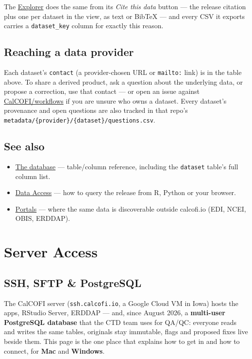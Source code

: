 \documentclass[
  letterpaper,
  DIV=11,
  numbers=noendperiod]{scrreprt}
\providecommand{\tightlist}{%
  \setlength{\itemsep}{0pt}\setlength{\parskip}{0pt}}
\begin{document}
The \href{https://calcofi.io/explore/}{Explorer} does the same from its
\emph{Cite this data} button --- the release citation plus one per
dataset in the view, as text or BibTeX --- and every CSV it exports
carries a \texttt{dataset\_key} column for exactly this reason.

\section{Reaching a data provider}\label{reaching-a-data-provider}

Each dataset's \texttt{contact} (a provider-chosen URL or
\texttt{mailto:} link) is in the table above. To share a derived
product, ask a question about the underlying data, or propose a
correction, use that contact --- or open an issue against
\href{https://github.com/CalCOFI/workflows/issues}{CalCOFI/workflows} if
you are unsure who owns a dataset. Every dataset's provenance and open
questions are also tracked in that repo's
\texttt{metadata/\{provider\}/\{dataset\}/questions.csv}.

\section{See also}\label{see-also-1}

\begin{itemize}
\tightlist
\item
  \hyperref[database]{The database} --- table/column reference,
  including the \texttt{dataset} table's full column list.
\item
  \hyperref[data-access]{Data Access} --- how to query the release from
  R, Python or your browser.
\item
  \href{portals.qmd}{Portals} --- where the same data is discoverable
  outside calcofi.io (EDI, NCEI, OBIS, ERDDAP).
\end{itemize}


\chapter{Server Access}\label{server-access}

\section{SSH, SFTP \& PostgreSQL}\label{sec-server-access}

The CalCOFI server (\texttt{ssh.calcofi.io}, a Google Cloud VM in Iowa)
hosts the apps, RStudio Server, ERDDAP --- and, since August 2026, a
\textbf{multi-user PostgreSQL database} that the CTD team uses for
QA/QC: everyone reads and writes the same tables, originals stay
immutable, flags and proposed fixes live beside them. This page is the
one place that explains how to get in and how to connect, for
\textbf{Mac} and \textbf{Windows}.
\end{document}
